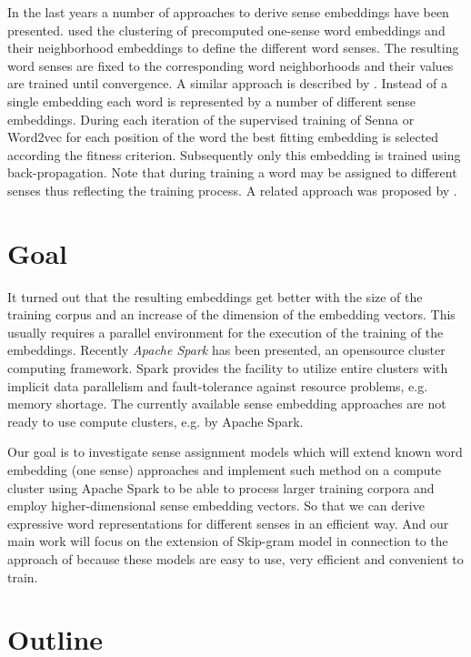 In the last years a number of approaches to derive sense embeddings have been presented. \cite{HuangSocherEtAl2012} used the clustering of precomputed one-sense word embeddings and their neighborhood embeddings to define the different word senses. The resulting word senses are fixed to the corresponding word neighborhoods and their values are trained until convergence. A similar approach is described by \cite{ChenLiuEtAl2014}. Instead of a single embedding each word is represented by a number of different sense embeddings. During each iteration of the supervised training of Senna or Word2vec for each position of the word the best fitting embedding is selected according the fitness criterion. Subsequently only this embedding is trained using back-propagation. Note that during training a word may be assigned to different senses thus reflecting the training process. A related approach was proposed by \cite{TianDaiEtAl2014}.


\section{Goal}


It turned out that the resulting embeddings get better with the size of the training corpus and an increase of the dimension of the embedding vectors. This usually requires a parallel environment for the execution of the training of the embeddings. Recently \emph{Apache Spark} \citep{ZahariaChowdhuryEtAl2010} has been presented, an opensource cluster computing framework. Spark provides the facility to utilize entire clusters with implicit data parallelism and fault-tolerance against resource problems, e.g. memory shortage. The currently available sense embedding approaches are not ready to use compute clusters, e.g. by Apache Spark. 

Our goal is to investigate sense assignment models which will extend known word embedding (one sense) approaches and implement such method on a compute cluster using Apache Spark to be able to process larger training corpora and employ higher-dimensional sense embedding vectors. So that we can derive expressive word representations for different senses in an efficient way. And our main work will focus on the extension of Skip-gram model \citep{MikolovSutskeverEtAl2013} in connection to the approach of \citep{NeelakantanShankarEtAl2015} because these models are easy to use, very efficient and convenient to train. 


\section{Outline}


